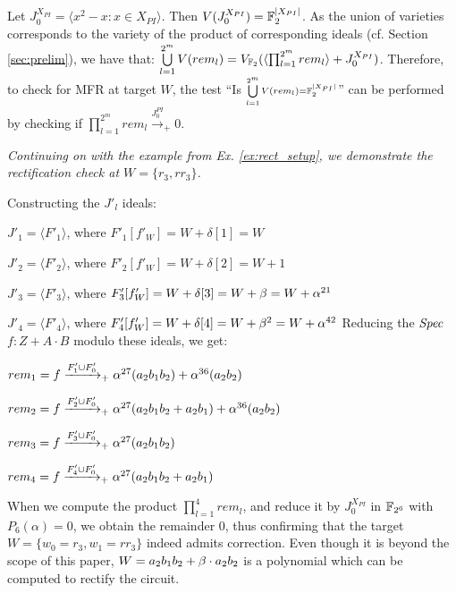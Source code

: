 Let $J_0^{X_{PI}} = \langle x^2-x: x\in X_{PI}\rangle$. Then
$V(J_0^{X_{PI}}) = {\mathbb{F}}_2^{|X_{PI}|}$. As the union of varieties
corresponds to the variety of the product of corresponding ideals
(cf. Section \ref{sec:prelim}), we have that: 
$\bigcup\limits_{l=1}^{2^m}V(rem_l) =
V_{{\mathbb{F}}_{2}}( \langle \prod_{l=1}^{2^m} rem_l \rangle +
J_0^{X_{PI}} )$.  
Therefore, to check for MFR at target $W$, the test ``Is
${\scriptstyle \bigcup\limits_{l=1}^{2^m}V(rem_l) =
  {\mathbb{F}}_2^{|X_{PI}|}}$'' can be performed by checking if
$\prod_{l=1}^{2^m} rem_l\xrightarrow{J_{0}^{PI}}_+0$. 

\begin{Example}
\label{ex:3}
{\it 
Continuing on with the example from Ex. \ref{ex:rect_setup}, we
demonstrate the rectification check at $W=\{r_3,rr_3\}$. 

Constructing the $J'_l$ ideals:
\bi
\item {\small$J'_1 = \langle F'_1\rangle$, where $F'_1[f'_W]=W+\delta[1]=W$}
\item {\small$J'_2 = \langle F'_2\rangle$, where $F'_2[f'_W]=W+\delta[2]=W+1$}
\item {\small$J'_3 = \langle F'_3\rangle$, where $F'_3[f'_W]=W+\delta[3]=W+\beta=W+\alpha^{21}$}
\item {\small$J'_4 = \langle F'_4\rangle$, where $F'_4[f'_W]=W+\delta[4]=W+\beta^2=W+\alpha^{42}$}
\ei
Reducing the ${\it Spec}$ $f: Z+A\cdot B$ modulo these ideals, we get:
\bi
\item $rem_1 = f \xrightarrow[]{F'_1\cup F'_{0}}_+{\alpha^{27} (a_2b_1b_2)+\alpha^{36} (a_2b_2)}$
\item $rem_2 = f \xrightarrow[]{F'_2\cup F'_{0}}_+{\alpha^{27} (a_2b_1b_2+a_2b_1)+\alpha^{36} (a_2b_2)}$
\item $rem_3 = f \xrightarrow[]{F'_3\cup F'_{0}}_+{\alpha^{27} (a_2b_1b_2)}$
\item $rem_4 = f \xrightarrow[]{F'_4\cup F'_{0}}_+{\alpha^{27} (a_2b_1b_2+a_2b_1)}$
\ei

When we compute the product $\prod_{l=1}^{4} rem_l$, 
and reduce it by $J_{0}^{X_{PI}}$ in ${\mathbb{F}}_{2^6}$ with
$P_6(\alpha)=0$, we obtain the remainder 0, thus confirming
that the target $W=\{w_0=r_3,w_1=rr_3\}$ indeed admits correction.
Even though it is beyond the scope of this paper, $W=a_2b_1b_2+\beta \cdot a_2b_2$ 
is a polynomial which can be computed to rectify the circuit. 
}
\end{Example}

